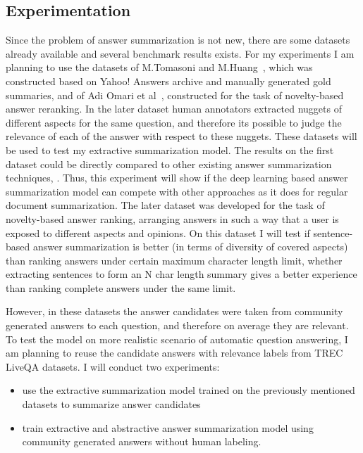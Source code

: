 \subsection{Experimentation}
\label{section:non-factoid:proposal:experiments}

Since the problem of answer summarization is not new, there are some datasets already available and several benchmark results exists.
For my experiments I am planning to use the datasets of M.Tomasoni and M.Huang~\cite{tomasoni2010metadata}, which was constructed based on Yahoo! Answers archive and manually generated gold summaries, and of Adi Omari et al~\cite{omari2016novelty}, constructed for the task of novelty-based answer reranking.
In the later dataset human annotators extracted nuggets of different aspects for the same question, and therefore its possible to judge the relevance of each of the answer with respect to these nuggets.
These datasets will be used to test my extractive summarization model.
The results on the first dataset could be directly compared to other existing answer summarization techniques, \eg \cite{zhaochun_sparsecoding_2016,erkan2004lexrank,tomasoni2010metadata}.
Thus, this experiment will show if the deep learning based answer summarization model can compete with other approaches as it does for regular document summarization.
The later dataset was developed for the task of novelty-based answer ranking, \ie arranging answers in such a way that a user is exposed to different aspects and opinions.
On this dataset I will test if sentence-based answer summarization is better (in terms of diversity of covered aspects) than ranking answers under certain maximum character length limit, \ie whether extracting sentences to form an N char length summary gives a better experience than ranking complete answers under the same limit.

However, in these datasets the answer candidates were taken from community generated answers to each question, and therefore on average they are relevant.
To test the model on more realistic scenario of automatic question answering, I am planning to reuse the candidate answers with relevance labels from TREC LiveQA datasets.
I will conduct two experiments: 
\begin{itemize}
\item use the extractive summarization model trained on the previously mentioned datasets to summarize answer candidates
\item train extractive and abstractive answer summarization model using community generated answers without human labeling.
\end{itemize}

